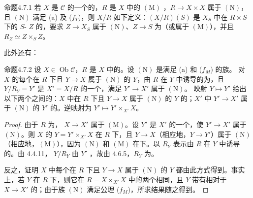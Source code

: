 \begin{SGAresult}{命题}{4.7.1}
若 $X$ 是 $\mathcal C$ 的一个的，$R$ 是 $X$ 中的 $(\mathrm M)$ ，$R\to X\times X$ 属于 $(\mathrm N)$，且 $(\mathrm N)$ 满足 (a) 及 ($f_T$)，则 $X/R$ 如下定义：$(X/R)(S)$ 是 $X_S$ 中在 $R\times S$ 下的 $S$- $Z$ 的，要求 $Z\to X_S$ 属于 $(\mathrm N)$、$Z\to S$ 为（或属于 $(\mathrm M)$），并且 $R_Z\simeq Z\times_S Z$。
\end{SGAresult}
此外还有：
\begin{SGAresult}{命题}{4.7.2}
设 $X\in\operatorname{Ob}\mathcal C$，$R$ 是 $X$ 中的。设 $(\mathrm N)$ 是满足 (a) 和 ($f_M$) 的族。
对 $X$ 的每个在 $R$ 下且 $Y\to X$ 属于 $(\mathrm N)$ 的 $Y$，由 $R$ 在 $Y$ 中诱导的为，且 $Y/R_Y=Y'$ 是 $X'=X/R$ 的一个，满足 $Y'\to X'$ 属于 $(\mathrm N)$。
映射 $Y\mapsto Y'$ 给出以下两个之间的：$X$ 中在 $R$ 下且 $Y\to X$ 属于 $(\mathrm N)$ 的 $Y$ 的；$X'$ 中 $Y'\to X'$ 属于 $(\mathrm N)$ 的 $Y'$ 的。逆映射为 $Y'\mapsto Y'\times_{X'}X$。
\end{SGAresult}
\begin{proof}
由于 $R$ 为， $X\to X'$ 属于 $(\mathrm M)$。设 $Y'$ 是 $X'$ 的一个，使 $Y'\to X'$ 属于 $(\mathrm N)$。则 $X$ 的 $Y=Y'\times_{X'}X$ 在 $R$ 下，且 $Y\to X$（相应地，$Y\to Y'$）属于 $(\mathrm N)$（相应地，$(\mathrm M)$），因为 $(\mathrm N)$ 和 $(\mathrm M)$ 在下。以 $R_Y$ 表示由 $R$ 在 $Y$ 中诱导的。由 4.4.11， $Y/R_Y$ 由 $Y'$ ，故由 4.6.5，$R_Y$ 为。

反之，证明 $X$ 中每个在 $R$ 下且 $Y\to X$ 属于 $(\mathrm N)$ 的 $Y$ 都由此方式得到。事实上，若 $Y$ 在 $R$ 下，则它在 $R=X\times_{X'}X$ 中的两个相同，且 $Y$ 带有相对于 $X\to X'$ 的；由于族 $(\mathrm N)$ 满足公理 ($f_M$)，所求结果随之得到。
\end{proof}
